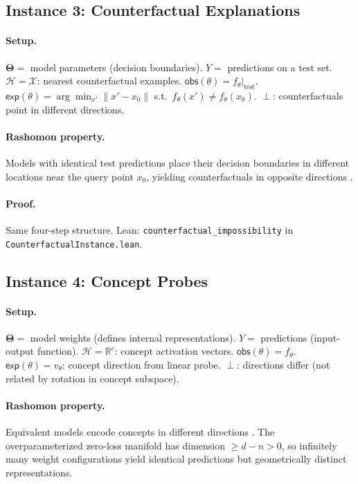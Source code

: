 \documentclass[11pt,a4paper]{article}
\newcommand{\R}{\mathbb{R}}
\newcommand{\Params}{\mathbf{\Theta}}
\newcommand{\sH}{\mathcal{H}}
\newcommand{\incomp}{\perp}
\begin{document}
\subsection{Instance 3: Counterfactual Explanations}
\label{app:proof-counterfactual}

\paragraph{Setup.}
$\Params ={}$ model parameters (decision boundaries).
$Y ={}$ predictions on a test set.
$\sH = \mathcal{X}$: nearest counterfactual examples.
$\mathsf{obs}(\theta) = f_\theta|_{\mathrm{test}}$.
$\mathsf{exp}(\theta) = \arg\min_{x'} \|x' - x_0\|$ s.t.\ $f_\theta(x') \neq f_\theta(x_0)$.
$\incomp$: counterfactuals point in different directions.

\paragraph{Rashomon property.}
Models with identical test predictions place their decision boundaries in
different locations near the query point $x_0$, yielding counterfactuals
in opposite directions \citep{semenova2022existence,fisher2019models}.

\paragraph{Proof.}
Same four-step structure.  Lean:
\texttt{counterfactual\_impossibility} in \texttt{Counterfactual\-Instance.lean}.

\subsection{Instance 4: Concept Probes}
\label{app:proof-concept}

\paragraph{Setup.}
$\Params ={}$ model weights (defines internal representations).
$Y ={}$ predictions (input-output function).
$\sH = \R^c$: concept activation vectors.
$\mathsf{obs}(\theta) = f_\theta$.
$\mathsf{exp}(\theta) = v_\theta$: concept direction from linear probe.
$\incomp$: directions differ (not related by rotation in concept subspace).

\paragraph{Rashomon property.}
Equivalent models encode concepts in different directions
\citep{bolukbasi2016man,kim2018tcav,ravfogel2020null}.  The
overparameterized zero-loss manifold has dimension $\geq d - n > 0$,
so infinitely many weight configurations yield identical predictions
but geometrically distinct representations.
\end{document}
